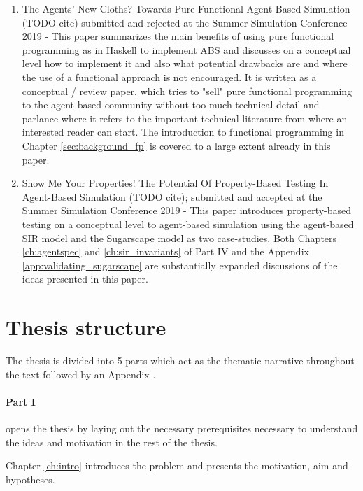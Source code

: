 \begin{enumerate}
	\item The Agents' New Cloths? Towards Pure Functional Agent-Based Simulation (TODO cite) submitted and rejected at the Summer Simulation Conference 2019 - This paper summarizes the main benefits of using pure functional programming as in Haskell to implement ABS and discusses on a conceptual level how to implement it and also what potential drawbacks are and where the use of a functional approach is not encouraged. It is written as a conceptual / review paper, which tries to "sell" pure functional programming to the agent-based community without too much technical detail and parlance where it refers to the important technical literature from where an interested reader can start. The introduction to functional programming in Chapter \ref{sec:background_fp} is covered to a large extent already in this paper.
	
	\item Show Me Your Properties! The Potential Of Property-Based Testing In Agent-Based Simulation (TODO cite); submitted and accepted at the Summer Simulation Conference 2019 - This paper introduces property-based testing on a conceptual level to agent-based simulation using the agent-based SIR model and the Sugarscape model as two case-studies. Both Chapters 
\ref{ch:agentspec} and \ref{ch:sir_invariants} of Part IV and the Appendix \ref{app:validating_sugarscape} are substantially expanded discussions of the ideas presented in this paper.
\end{enumerate}


\section{Thesis structure}

The thesis is divided into 5 parts which act as the thematic narrative throughout the text followed by an Appendix . 

\paragraph{Part I} opens the thesis by laying out the necessary prerequisites necessary to understand the ideas and motivation in the rest of the thesis.
\medskip

Chapter \ref{ch:intro} introduces the problem and presents the motivation, aim and hypotheses.

